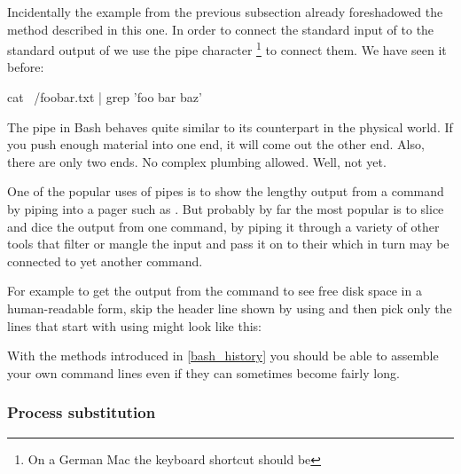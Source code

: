 \documentclass{olli-handout}
\begin{document}
Incidentally the example from the previous subsection already foreshadowed the method described in this one. In order to connect the standard input of  to the standard output of  we use the pipe character \TTQ{\textbar}\footnote{On a German Mac the keyboard shortcut should be } to connect them. We have seen it before:

\begin{lstbash}
cat ~/foobar.txt | grep 'foo bar baz'
\end{lstbash}

The pipe in Bash behaves quite similar to its counterpart in the physical world. If you push enough material into one end, it will come out the other end. Also, there are only two ends. No complex plumbing allowed. Well, not yet.

One of the popular uses of pipes is to show the lengthy output from a command by piping into a pager such as . But probably by far the most popular is to slice and dice the output from one command, by piping it through a variety of other tools that filter or mangle the input and pass it on to their  which in turn may be connected to yet another command.

For example to get the output from the  command to see free disk space in a human-readable form, skip the header line shown by  using  and then pick only the lines that start with  using  might look like this:


With the methods introduced in \vref{bash_history} you should be able to assemble your own command lines even if they can sometimes become fairly long.

\subsubsection{Process substitution}

\begin{refmanbash}
\end{refmanbash}
\end{document}

